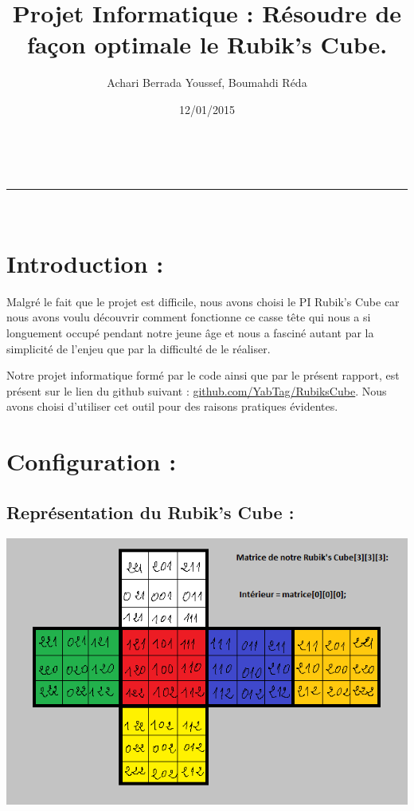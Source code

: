 \documentclass[a4paper,11pt]{article}
\makeatletter
\newcommand{\linia}{\rule{\linewidth}{0.5pt}}
\theoremstyle{mytheor}
\renewcommand{\maketitle}{
\begin{center}
\vspace{2ex}
{\huge \textsc{\@title}}
\vspace{1ex}
\\
\linia\\
\@author \hfill \@date
\vspace{4ex}
\end{center}
}
\makeatother
\begin{document}
\title{Projet Informatique : Résoudre de façon optimale le Rubik's Cube.}

\author{Achari Berrada Youssef, Boumahdi Réda}

\date{12/01/2015}

\maketitle



\section*{Introduction :}
Malgré le fait que le projet est difficile, nous avons choisi le PI Rubik's Cube car nous avons voulu découvrir comment fonctionne ce casse tête qui nous a si longuement occupé pendant notre jeune âge et nous a fasciné autant par la simplicité de l'enjeu que par la difficulté de le réaliser.

Notre projet informatique formé par le code ainsi que par le présent rapport, est présent sur le lien du github suivant : \underline{\href{https://github.com/YabTag/RubiksCube}{github.com/YabTag/RubiksCube}}. Nous avons choisi d'utiliser cet outil pour des raisons pratiques évidentes.

\section{Configuration :}

\subsection{Représentation du Rubik's Cube : }

\includegraphics[scale=1]{RubiksCube.png}
\end{document}
